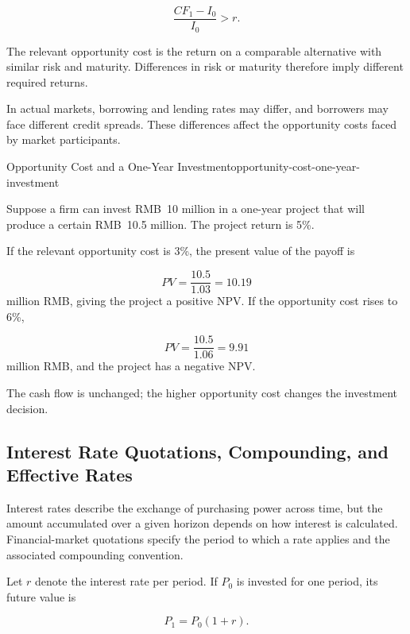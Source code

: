 \begin{equation*}
\frac{CF_1-I_0}{I_0}>r.
\label{eq:ch6-return-hurdle-simple}
\end{equation*}

The relevant opportunity cost is the return on a comparable alternative with similar risk and maturity. Differences in risk or maturity therefore imply different required returns.

In actual markets, borrowing and lending rates may differ, and borrowers may face different credit spreads. These differences affect the opportunity costs faced by market participants.

\begin{example}{Opportunity Cost and a One-Year Investment}{opportunity-cost-one-year-investment}

Suppose a firm can invest RMB~10 million in a one-year project that will produce a certain RMB~10.5 million. The project return is 5\%.

If the relevant opportunity cost is 3\%, the present value of the payoff is

$$
PV=\frac{10.5}{1.03}=10.19
$$
million RMB, giving the project a positive NPV. If the opportunity cost rises to 6\%,

$$
PV=\frac{10.5}{1.06}=9.91
$$
million RMB, and the project has a negative NPV.

The cash flow is unchanged; the higher opportunity cost changes the investment decision.

\end{example}



\subsection{Interest Rate Quotations, Compounding, and Effective Rates}

Interest rates describe the exchange of purchasing power across time, but the amount accumulated over a given horizon depends on how interest is calculated. Financial-market quotations specify the period to which a rate applies and the associated compounding convention.

Let $r$ denote the interest rate per period. If $P_0$ is invested for one period, its future value is

\begin{equation}
P_1=P_0(1+r).
\label{eq:ch6-one-period-growth}
\end{equation}

